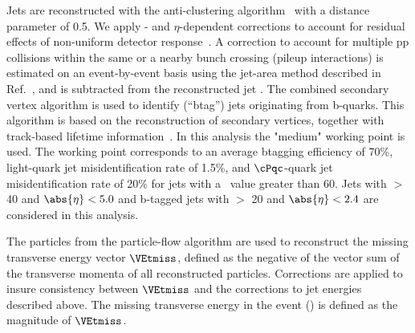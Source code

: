 Jets are reconstructed with the anti-\kt clustering
algorithm~\cite{Cacciari:2008gp} with a distance parameter of 0.5. We apply
\pt- and $\eta$-dependent corrections to account for residual
effects of non-uniform detector response~\cite{Chatrchyan:2011ds}.
A correction to account for multiple pp collisions within the same or a nearby
bunch crossing (pileup interactions) is estimated on an event-by-event basis using the
jet-area method described in Ref.~\cite{cacciari-2008-659}, and is
subtracted from the reconstructed jet \pt.
The combined secondary vertex algorithm is used to identify (``btag'') jets 
originating from b-quarks.  This algorithm 
 is based on the reconstruction of secondary vertices, together with track-based lifetime information~\cite{Chatrchyan:2012jua}. 
In this analysis the "medium" working point is used. The working point corresponds to an average btagging efficiency of 70\%, 
light-quark jet misidentification rate of 1.5\%, and $\cPqc$-quark jet misidentification rate of 20\% 
for jets with a \pt\ value greater than 60\GeV.
Jets with  \PT $>$ 40 \GeV and $\abs{\eta} < 5.0$ and b-tagged jets with \PT $>$ 20 \GeV and $\abs{\eta} < 2.4$ are considered in this analysis.


The particles from the particle-flow algorithm are used to reconstruct the missing transverse energy vector $\VEtmiss$, defined as the negative of the vector sum of the transverse momenta of all reconstructed particles.  Corrections are applied to insure consistency between
$\VEtmiss$ and the corrections to jet energies described above.  The missing transverse energy in the event (\MET) is defined as the magnitude of $\VEtmiss$.



